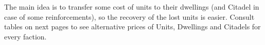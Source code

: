 
The main idea is to transfer some cost of units to their dwellings (and Citadel in case of some reinforcements), so the recovery of the lost units is easier. Consult tables on next pages to see alternative prices of Units, Dwellings and Citadels for every faction.
